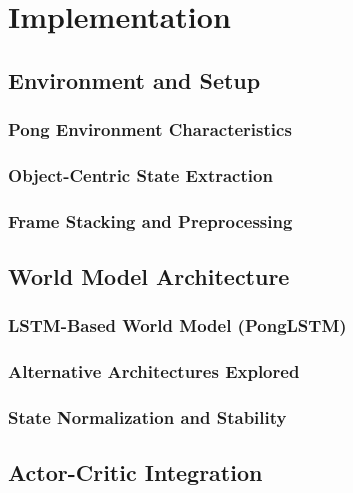 \documentclass[
	english,
	ruledheaders=section,
	class=report,
	thesis={type=master},
	accentcolor=9c,
	custommargins=true,
	marginpar=false,
	parskip=half-,
	fontsize=11pt,
]{tudapub}
\begin{document}
\chapter{Implementation}
\label{chap:implementation}

\section{Environment and Setup}
\label{sec:environment}

\subsection{Pong Environment Characteristics}
\label{subsec:pong_characteristics}

\subsection{Object-Centric State Extraction}
\label{subsec:state_extraction}

\subsection{Frame Stacking and Preprocessing}
\label{subsec:preprocessing}

\section{World Model Architecture}
\label{sec:world_model_arch}

\subsection{LSTM-Based World Model (PongLSTM)}
\label{subsec:ponglstm}

\subsection{Alternative Architectures Explored}
\label{subsec:alternative_architectures}

\subsection{State Normalization and Stability}
\label{subsec:normalization}

\section{Actor-Critic Integration}
\label{sec:actor_critic}
\end{document}
